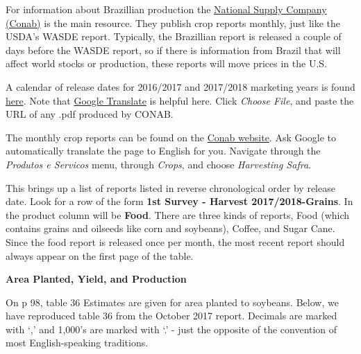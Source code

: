 \documentclass[
]{book}
\begin{document}
For information about Brazillian production the \href{http://www.conab.gov.br/index.php}{National Supply Company (Conab)} is the main resource. They publish crop reports monthly, just like the USDA's WASDE report. Typically, the Brazillian report is released a couple of days before the WASDE report, so if there is information from Brazil that will affect world stocks or production, these reports will move prices in the U.S.

A calendar of release dates for 2016/2017 and 2017/2018 marketing years is found \href{http://www.conab.gov.br/OlalaCMS/uploads/arquivos/17_04_13_10_16_02_calendario_safras_2017_para_site-1.pdf}{here}. Note that \href{https://translate.google.com/?tr=f\&hl=en}{Google Translate} is helpful here. Click \emph{Choose File}, and paste the URL of any .pdf produced by CONAB.

The monthly crop reports can be found on the \href{http://www.conab.gov.br/index.php}{Conab website}. Ask Google to automatically translate the page to English for you. Navigate through the \emph{Produtos e Servicos} menu, through \emph{Crops}, and choose \emph{Harvesting Safra}.

This brings up a list of reports listed in reverse chronological order by release date. Look for a row of the form \textbf{1st Survey - Harvest 2017/2018-Grains}. In the product column will be \textbf{Food}. There are three kinds of reports, Food (which contains grains and oilseeds like corn and soybeans), Coffee, and Sugar Cane. Since the food report is released once per month, the most recent report should always appear on the first page of the table.

\textbf{Area Planted, Yield, and Production}

On p 98, table 36 Estimates are given for area planted to soybeans. Below, we have reproduced table 36 from the October 2017 report. Decimals are marked with `,' and 1,000's are marked with `.' - just the opposite of the convention of most English-speaking traditions.
\end{document}
